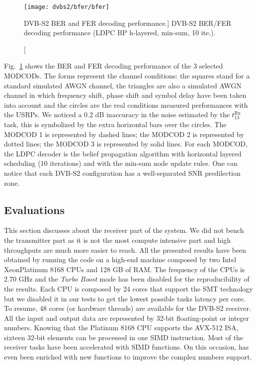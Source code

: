 \begin{figure}[htp]
  \centering
  \texttt{[image: dvbs2/bfer/bfer]}
  \caption
    [DVB-S2 BER and FER decoding performance.]
    {DVB-S2 BER/FER decoding performance (LDPC BP h-layered, min-sum, 10 ite.).}
  \label{fig:dvbs2_bfer}
\end{figure}

Fig.~\ref{fig:dvbs2_bfer} shows the BER and FER decoding performance of the
3 selected MODCODs. The forms represent the channel conditions: the squares
stand for a standard simulated AWGN channel, the triangles are also a simulated
AWGN channel in which frequency shift, phase shift and symbol delay have been
taken into account and the circles are the real conditions measured performances
with the USRPs. We noticed a 0.2 dB inaccuracy in the noise estimated by the
$t^\text{Rx}_{13}$ task, this is symbolized by the extra horizontal bars over
the circles. The {\color{Paired-1} MODCOD 1} is represented by dashed lines; the
{\color{Paired-3} MODCOD 2} is represented by dotted lines; the
{\color{Paired-5} MODCOD 3} is represented by solid lines. For each MODCOD, the
LDPC decoder is the belief propagation algorithm with horizontal layered
scheduling (10 iterations) and with the min-sum node update rules. One can
notice that each DVB-S2 configuration has a well-separated SNR predilection
zone.

\subsection{Evaluations}

This section discusses about the receiver part of the system. We did not bench
the transmitter part as it is not the most compute intensive part and high
throughputs are much more easier to reach. All the presented results have been
obtained by running the code on a high-end machine composed by two Intel\R
Xeon\TM Platinum 8168 CPUs and 128 GB of RAM. The frequency of the CPUs is 2.70
GHz and the \emph{Turbo Boost} mode has been disabled for the reproducibility of
the results. Each CPU is composed by 24 cores that support the SMT technology
but we disabled it in our tests to get the lowest possible tasks latency per
core. To resume, 48 cores (or hardware threads) are available for the DVB-S2
receiver. All the input and output data are represented by 32-bit floating-point
or integer numbers. Knowing that the Platinum 8168 CPU supports the AVX-512 ISA,
sixteen 32-bit elements can be processed in one SIMD instruction. Most of the
receiver tasks have been accelerated with \MIPP SIMD functions. On this
occasion, \MIPP has even been enriched with new functions to improve the complex
numbers support.

